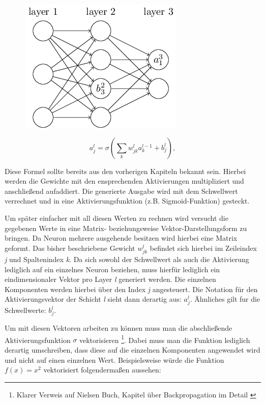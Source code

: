 \begin{figure}[!htb]
	\centering
	\includegraphics[width=.4\linewidth]{img/biasAct_notation}
	\label{fig:biasAct_not}
\end{figure}

\begin{equation} \label{eq:act}
a^{l}_j = \sigma\left( \sum_k w^{l}_{jk} a^{l-1}_k + b^l_j \right),
\end{equation}

Diese Formel sollte bereits aus den vorherigen Kapiteln bekannt sein. Hierbei werden die Gewichte mit den ensprechenden Aktivierungen multipliziert und anschließend aufaddiert. Die generierte Ausgabe wird mit dem Schwellwert verrechnet und in eine Aktivierungsfunktion (z.B. Sigmoid-Funktion) gesteckt.

Um später einfacher mit all diesen Werten zu rechnen wird versucht die gegebenen Werte in eine Matrix- beziehungsweise Vektor-Darstellungsform zu bringen. Da Neuron mehrere ausgehende  besitzen wird hierbei eine Matrix geformt. Das bisher beschriebene Gewicht $w^l_{jk}$ befindet sich hierbei im Zeileindex \emph{j} und Spaltenindex \emph{k}. Da sich sowohl der Schwellwert als auch die Aktivierung lediglich auf ein einzelnes Neuron beziehen, muss hierfür lediglich ein eindimensionaler Vektor pro Layer \emph{l} generiert werden. Die einzelnen Komponenten werden hierbei über den Index \emph{j} angesteuert. Die Notation für den Aktivierungsvektor der Schicht \emph{l} sieht dann derartig aus: $a^l_j$. Ähnliches gilt fur die Schwellwerte: $b^l_j$. 

Um mit diesen Vektoren arbeiten zu können muss man die abschließende Aktivierungsfunktion $\sigma$ vektorisieren 
\footnote{Klarer Verweis auf Nielsen Buch, Kapitel über Backpropagation im Detail \cite{dlnielsen}}. 
Dabei muss man die Funktion lediglich derartig umschreiben, dass diese auf die einzelnen Komponenten angewendet wird und nicht auf einen einzelnen Wert. Beispielsweise würde die Funktion $f(x) = x^2$ vektorisiert folgendermaßen aussehen: 

